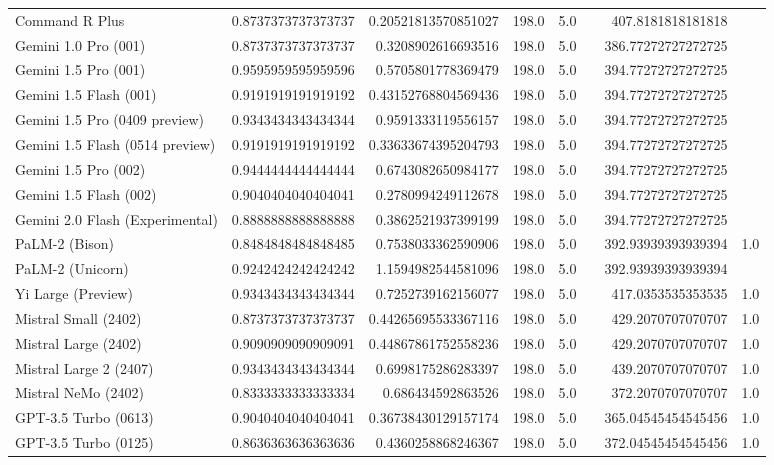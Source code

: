\begin{table}[htp]
{\begin{tabular}{lrrrrrrr}
Command R Plus & 0.8737373737373737 & 0.20521813570851027 & 198.0 & 5.0 &  & 407.8181818181818 &  \\
Gemini 1.0 Pro (001) & 0.8737373737373737 & 0.3208902616693516 & 198.0 & 5.0 &  & 386.77272727272725 &  \\
Gemini 1.5 Pro (001) & 0.9595959595959596 & 0.5705801778369479 & 198.0 & 5.0 &  & 394.77272727272725 &  \\
Gemini 1.5 Flash (001) & 0.9191919191919192 & 0.43152768804569436 & 198.0 & 5.0 &  & 394.77272727272725 &  \\
Gemini 1.5 Pro (0409 preview) & 0.9343434343434344 & 0.9591333119556157 & 198.0 & 5.0 &  & 394.77272727272725 &  \\
Gemini 1.5 Flash (0514 preview) & 0.9191919191919192 & 0.33633674395204793 & 198.0 & 5.0 &  & 394.77272727272725 &  \\
Gemini 1.5 Pro (002) & 0.9444444444444444 & 0.6743082650984177 & 198.0 & 5.0 &  & 394.77272727272725 &  \\
Gemini 1.5 Flash (002) & 0.9040404040404041 & 0.2780994249112678 & 198.0 & 5.0 &  & 394.77272727272725 &  \\
Gemini 2.0 Flash (Experimental) & 0.8888888888888888 & 0.3862521937399199 & 198.0 & 5.0 &  & 394.77272727272725 &  \\
PaLM-2 (Bison) & 0.8484848484848485 & 0.7538033362590906 & 198.0 & 5.0 &  & 392.93939393939394 & 1.0 \\
PaLM-2 (Unicorn) & 0.9242424242424242 & 1.1594982544581096 & 198.0 & 5.0 &  & 392.93939393939394 &  \\
Yi Large (Preview) & 0.9343434343434344 & 0.7252739162156077 & 198.0 & 5.0 &  & 417.0353535353535 & 1.0 \\
Mistral Small (2402) & 0.8737373737373737 & 0.44265695533367116 & 198.0 & 5.0 &  & 429.2070707070707 & 1.0 \\
Mistral Large (2402) & 0.9090909090909091 & 0.44867861752558236 & 198.0 & 5.0 &  & 429.2070707070707 & 1.0 \\
Mistral Large 2 (2407) & 0.9343434343434344 & 0.6998175286283397 & 198.0 & 5.0 &  & 439.2070707070707 & 1.0 \\
Mistral NeMo (2402) & 0.8333333333333334 & 0.686434592863526 & 198.0 & 5.0 &  & 372.2070707070707 & 1.0 \\
GPT-3.5 Turbo (0613) & 0.9040404040404041 & 0.36738430129157174 & 198.0 & 5.0 &  & 365.04545454545456 & 1.0 \\
GPT-3.5 Turbo (0125) & 0.8636363636363636 & 0.4360258868246367 & 198.0 & 5.0 &  & 372.04545454545456 & 1.0 \\

\end{tabular}}
\end{table}
